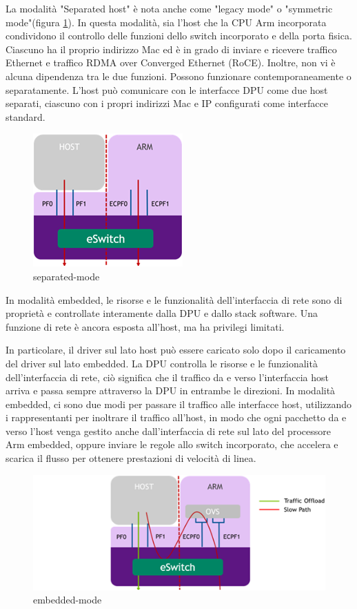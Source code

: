 \documentclass[binding=0.6cm]{sapthesis}
\theoremstyle{definition}
\begin{document}
La modalità "Separated host" è nota anche come "legacy mode" o "symmetric mode"(figura \ref{fig:sep-mode}). 
In questa modalità, sia l'host che la CPU Arm incorporata condividono il controllo delle funzioni dello switch incorporato e della porta fisica.
Ciascuno ha il proprio indirizzo Mac ed è in grado di inviare e ricevere traffico Ethernet e traffico RDMA over Converged Ethernet (RoCE).
Inoltre, non vi è alcuna dipendenza tra le due funzioni. Possono funzionare contemporaneamente o separatamente. 
L'host può comunicare con le interfacce DPU come due host separati, ciascuno con i propri indirizzi Mac e IP configurati come interfacce standard.
\begin{figure}[H]
    \centering
    \includegraphics[]{separated-mode.png}
    \caption{separated-mode}
    \label{fig:sep-mode}
\end{figure}

In modalità embedded, le risorse e le funzionalità dell'interfaccia di rete sono di proprietà e 
controllate interamente dalla DPU e dallo stack software. 
Una funzione di rete è ancora esposta all'host, ma ha privilegi limitati.

In particolare, il driver sul lato host può essere caricato solo dopo il caricamento del driver
 sul lato embedded. 
La DPU controlla le risorse e le funzionalità dell'interfaccia di rete, ciò significa che il 
traffico da e verso l'interfaccia host 
arriva e passa sempre attraverso la DPU in entrambe le direzioni. 
In modalità embedded, ci sono due modi per passare il traffico alle interfacce host, utilizzando 
i rappresentanti per inoltrare il traffico all'host, 
in modo che ogni pacchetto da e verso l'host venga gestito anche dall'interfaccia di rete sul lato del processore Arm embedded, oppure
 inviare le regole allo switch incorporato, che accelera e scarica il flusso per ottenere prestazioni di velocità di linea.
\begin{figure}[H]
    \centering
    \includegraphics[]{embedded-mode.png}
    \caption{embedded-mode}
    \label{fig:emb-mode}
\end{figure}
\end{document}
